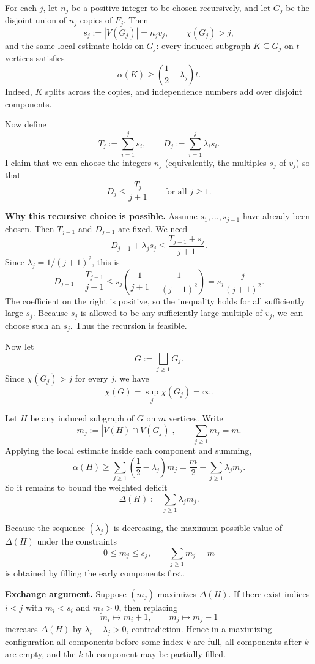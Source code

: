 For each $j$, let $n_j$ be a positive integer to be chosen recursively, and let $G_j$ be the disjoint union of $n_j$ copies of $F_j$.
Then
\[
s_j:=|V(G_j)|=n_jv_j,
\qquad
\chi(G_j)>j,
\]
and the same local estimate holds on $G_j$:
every induced subgraph $K\subseteq G_j$ on $t$ vertices satisfies
\[
\alpha(K)\ge \left(\frac12-\lambda_j\right)t.
\]
Indeed, $K$ splits across the copies, and independence numbers add over disjoint components.

Now define
\[
T_j:=\sum_{i=1}^j s_i,
\qquad
D_j:=\sum_{i=1}^j \lambda_i s_i.
\]
I claim that we can choose the integers $n_j$ (equivalently, the multiples $s_j$ of $v_j$) so that
\[
D_j\le \frac{T_j}{j+1}
\qquad\text{for all }j\ge 1.
\]

\medskip
\noindent
\textbf{Why this recursive choice is possible.}
Assume $s_1,\dots,s_{j-1}$ have already been chosen.
Then $T_{j-1}$ and $D_{j-1}$ are fixed.
We need
\[
D_{j-1}+\lambda_js_j\le \frac{T_{j-1}+s_j}{j+1}.
\]
Since $\lambda_j=1/(j+1)^2$, this is
\[
D_{j-1}-\frac{T_{j-1}}{j+1}
\le
s_j\left(\frac{1}{j+1}-\frac{1}{(j+1)^2}\right)
=
s_j\frac{j}{(j+1)^2}.
\]
The coefficient on the right is positive, so the inequality holds for all sufficiently large $s_j$.
Because $s_j$ is allowed to be any sufficiently large multiple of $v_j$, we can choose such an $s_j$.
Thus the recursion is feasible.

Now let
\[
G:=\bigsqcup_{j\ge 1}G_j.
\]
Since $\chi(G_j)>j$ for every $j$, we have
\[
\chi(G)=\sup_j\chi(G_j)=\infty.
\]

Let $H$ be any induced subgraph of $G$ on $m$ vertices.
Write
\[
m_j:=|V(H)\cap V(G_j)|,
\qquad
\sum_{j\ge 1}m_j=m.
\]
Applying the local estimate inside each component and summing,
\[
\alpha(H)\ge \sum_{j\ge 1}\left(\frac12-\lambda_j\right)m_j
=
\frac m2-\sum_{j\ge 1}\lambda_j m_j.
\]
So it remains to bound the weighted deficit
\[
\Delta(H):=\sum_{j\ge 1}\lambda_j m_j.
\]

Because the sequence $(\lambda_j)$ is decreasing, the maximum possible value of $\Delta(H)$ under the constraints
\[
0\le m_j\le s_j,
\qquad
\sum_{j\ge 1}m_j=m
\]
is obtained by filling the early components first.

\medskip
\noindent
\textbf{Exchange argument.}
Suppose $(m_j)$ maximizes $\Delta(H)$.
If there exist indices $i<j$ with $m_i<s_i$ and $m_j>0$, then replacing
\[
m_i\mapsto m_i+1,\qquad m_j\mapsto m_j-1
\]
increases $\Delta(H)$ by $\lambda_i-\lambda_j>0$, contradiction.
Hence in a maximizing configuration all components before some index $k$ are full, all components after $k$ are empty, and the $k$-th component may be partially filled.

